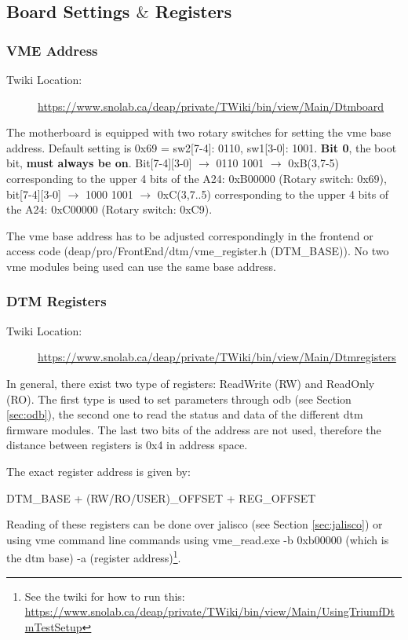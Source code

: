 \subsection{Board Settings $\&$ Registers}
\subsubsection{VME Address}
\begin{description}
\item[Twiki Location: ]\url{https://www.snolab.ca/deap/private/TWiki/bin/view/Main/Dtmboard}
\end{description}
The motherboard is equipped with two rotary switches for setting the \gls{vme} base address. Default setting is 0x69 = sw2[7-4]: 0110, sw1[3-0]: 1001. \textbf{Bit 0}, the boot bit, \textbf{must always be on}. Bit[7-4][3-0] $\rightarrow$ 0110 1001 $\rightarrow$ 0xB(3,7-5) corresponding to the upper 4 bits of the A24: 0xB00000 (Rotary switch: 0x69), bit[7-4][3-0] $\rightarrow$ 1000 1001 $\rightarrow$ 0xC(3,7..5) corresponding to the upper 4 bits of the A24: 0xC00000 (Rotary switch: 0xC9).

The \gls{vme} base address has to be adjusted correspondingly in the frontend or access code (deap/pro/FrontEnd/dtm/vme\_register.h (DTM\_BASE)). No two \gls{vme} modules being used can use the same base address. %

\subsubsection{DTM Registers}
\begin{description}
\item[Twiki Location: ]\url{https://www.snolab.ca/deap/private/TWiki/bin/view/Main/Dtmregisters}
\end{description}

In general, there exist two type of registers: ReadWrite (RW) and ReadOnly (RO). The first type is used to set parameters through \gls{odb} (see Section \ref{sec:odb}), the second one to read the status and data of the different \gls{dtm} firmware modules. The last two bits of the address are not used, therefore the distance between registers is 0x4 in address space.

The exact register address is given by:

DTM\_BASE + (RW/RO/USER)\_OFFSET + REG\_OFFSET

Reading of these registers can be done over \gls{jalisco} (see Section \ref{sec:jalisco}) or using \gls{vme} command line commands using vme\_read.exe -b 0xb00000 (which is the dtm base) -a (register address)\footnote{See the twiki for how to run this:\\ \url{https://www.snolab.ca/deap/private/TWiki/bin/view/Main/UsingTriumfDtmTestSetup}}.

